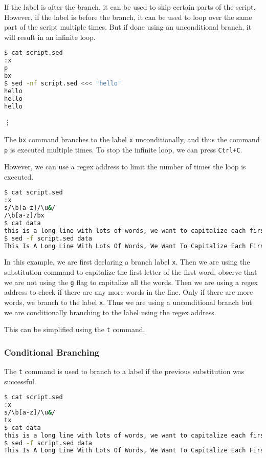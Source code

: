 If the label is after the branch, it can be used to skip certain parts of the script.
However, if the label is before the branch, it can be used to loop over the same part of the script multiple times.
But if done using an unconditional branch, it will result in an infinite loop.

\begin{lstlisting}[language=bash]
$ cat script.sed
:x
p
bx
$ sed -nf script.sed <<< "hello"
hello
hello
hello
\end{lstlisting}
\vdots

The \lstinline|bx| command branches to the label \lstinline|x| unconditionally, and thus the command \lstinline|p| is executed multiple times.
To stop the infinite loop, we can press \lstinline|Ctrl+C|.

However, we can use a regex address to limit the number of times the loop is executed.

\begin{lstlisting}[language=bash]
$ cat script.sed
:x
s/\b[a-z]/\u&/
/\b[a-z]/bx
$ cat data
this is a long line with lots of words, we want to capitalize each first letter of a word.
$ sed -f script.sed data
This Is A Long Line With Lots Of Words, We Want To Capitalize Each First Letter Of A Word.
\end{lstlisting}

In this example, we are first declaring a branch label \lstinline|x|.
Then we are using the substitution command to capitalize the first letter of the first word,
observe that we are not using the \lstinline|g| flag to capitalize all the words.
Then we are using a regex address to check if there are any more words in the line.
Only if there are more words, we branch to the label \lstinline|x|.
Thus we are using a unconditional branch but we are conditionally branching to the label using the regex address.

This can be simplified using the \lstinline|t| command.

\subsubsection{Conditional Branching}

The \lstinline|t| command is used to branch to a label if the previous substitution was successful.

\begin{lstlisting}[language=bash]
$ cat script.sed
:x
s/\b[a-z]/\u&/
tx
$ cat data
this is a long line with lots of words, we want to capitalize each first letter of a word.
$ sed -f script.sed data
This Is A Long Line With Lots Of Words, We Want To Capitalize Each First Letter Of A Word.
\end{lstlisting}

